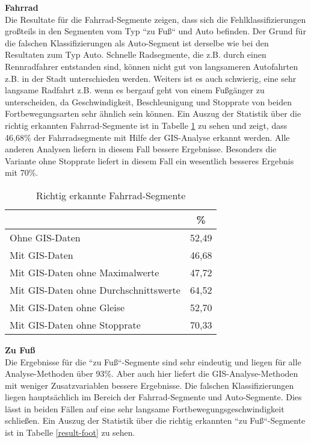 \textbf{Fahrrad} \\	
Die Resultate für die Fahrrad-Segmente zeigen, dass sich die Fehlklassifizierungen großteils in den Segmenten vom Typ ``zu Fuß`` und Auto befinden. Der Grund für die falschen Klassifizierungen als Auto-Segment ist derselbe wie bei den Resultaten zum Typ Auto. Schnelle Radsegmente, die z.B. durch einen Rennradfahrer entstanden sind, können nicht gut von langsameren Autofahrten z.B. in der Stadt unterschieden werden. Weiters ist es auch schwierig, eine sehr langsame Radfahrt z.B. wenn es bergauf geht von einem Fußgänger zu unterscheiden, da Geschwindigkeit, Beschleunigung und Stopprate von beiden Fortbewegungsarten sehr ähnlich sein können. Ein Auszug der Statistik über die richtig erkannten Fahrrad-Segmente ist in Tabelle \ref{result-bike} zu sehen und zeigt, dass 46,68\% der Fahrradsegmente mit Hilfe der GIS-Analyse erkannt werden. Alle anderen Analysen liefern in diesem Fall bessere Ergebnisse. Besonders die Variante ohne Stopprate liefert in diesem Fall ein wesentlich besseres Ergebnis mit 70\%.

\begin{table}[h]
\centering
\begin{tabular}{|l|c|}
\hline
 & \% \\ \hline
Ohne GIS-Daten & 52,49 \\ \hline
Mit GIS-Daten & 46,68 \\ \hline
Mit GIS-Daten ohne Maximalwerte & 47,72 \\ \hline
Mit GIS-Daten ohne Durchschnittswerte & 64,52 \\ \hline
Mit GIS-Daten ohne Gleise & 52,70 \\ \hline
Mit GIS-Daten ohne Stopprate & 70,33 \\ \hline
\end{tabular}
\caption{Richtig erkannte Fahrrad-Segmente}
\label{result-bike}
\end{table}

\textbf{Zu Fuß} \\
Die Ergebnisse für die ``zu Fuß``-Segmente sind sehr eindeutig und liegen für alle Analyse-Methoden über 93\%.  Aber auch hier liefert die GIS-Analyse-Methoden mit weniger Zusatzvariablen bessere Ergebnisse. Die falschen Klassifizierungen liegen hauptsächlich im Bereich der Fahrrad-Segmente und Auto-Segmente. Dies lässt in beiden Fällen auf eine sehr langsame Fortbewegungsgeschwindigkeit schließen. Ein Auszug der Statistik über die richtig erkannten ``zu Fuß``-Segmente ist in Tabelle \ref{result-foot} zu sehen.

